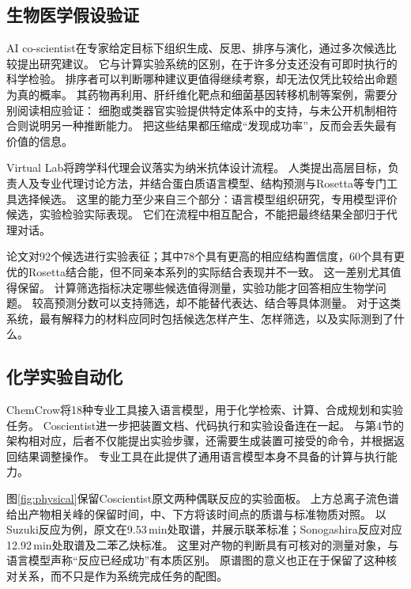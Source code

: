 \subsection{生物医学假设验证}
AI co-scientist在专家给定目标下组织生成、反思、排序与演化，通过多次候选比较提出研究建议\cite{cosci}。
它与计算实验系统的区别，在于许多分支还没有可即时执行的科学检验。
排序者可以判断哪种建议更值得继续考察，却无法仅凭比较给出命题为真的概率。
其药物再利用、肝纤维化靶点和细菌基因转移机制等案例，需要分别阅读相应验证：
细胞或类器官实验提供特定体系中的支持，与未公开机制相符合则说明另一种推断能力。
把这些结果都压缩成“发现成功率”，反而会丢失最有价值的信息。

Virtual Lab将跨学科代理会议落实为纳米抗体设计流程\cite{virtual}。
人类提出高层目标，负责人及专业代理讨论方法，并结合蛋白质语言模型、结构预测与Rosetta等专门工具选择候选。
这里的能力至少来自三个部分：语言模型组织研究，专用模型评价候选，实验检验实际表现。
它们在流程中相互配合，不能把最终结果全部归于代理对话。

论文对92个候选进行实验表征；其中78个具有更高的相应结构置信度，60个具有更优的Rosetta结合能，但不同亲本系列的实际结合表现并不一致\cite{virtual}。
这一差别尤其值得保留。
计算筛选指标决定哪些候选值得测量，实验功能才回答相应生物学问题。
较高预测分数可以支持筛选，却不能替代表达、结合等具体测量。
对于这类系统，最有解释力的材料应同时包括候选怎样产生、怎样筛选，以及实际测到了什么。

\subsection{化学实验自动化}
ChemCrow将18种专业工具接入语言模型，用于化学检索、计算、合成规划和实验任务\cite{chemcrow}。
Coscientist进一步把装置文档、代码执行和实验设备连在一起\cite{chem}。
与第4节的架构相对应，后者不仅能提出实验步骤，还需要生成装置可接受的命令，并根据返回结果调整操作。
专业工具在此提供了通用语言模型本身不具备的计算与执行能力。

图\ref{fig:physical}保留Coscientist原文两种偶联反应的实验面板。
上方总离子流色谱给出产物相关峰的保留时间，中、下方将该时间点的质谱与标准物质对照。
以Suzuki反应为例，原文在9.53\,min处取谱，并展示联苯标准；Sonogashira反应对应12.92\,min处取谱及二苯乙炔标准。
这里对产物的判断具有可核对的测量对象，与语言模型声称“反应已经成功”有本质区别。
原谱图的意义也正在于保留了这种核对关系，而不只是作为系统完成任务的配图。


